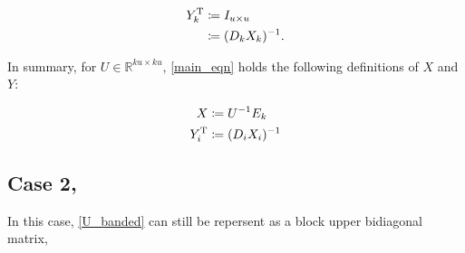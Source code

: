 \begin{align*}
    Y_{k}^{\mathrm{T}} &\coloneqq I_{u \times u} \\
        &\coloneqq (D_{k} X_{k})^{-1}.
\end{align*}

\noindent In summary, for $U \in \mathbb{R}^{ku \times ku}$, \eqref{main_eqn} holds the following definitions of $X$ and $Y$:

\begin{align}
    X &\coloneqq U^{-1} E_{k} \nonumber \\
    Y_{i}^{\mathrm{T}} &\coloneqq (D_{i} X_{i})^{-1} \label{Yti_blockbi}
\end{align}




\subsection*{Case 2, }

In this case, \eqref{U_banded} can still be repersent as a block upper bidiagonal matrix,

